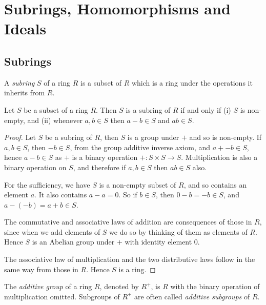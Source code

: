 \section{Subrings, Homomorphisms and Ideals}

\subsection{Subrings}

\begin{Def}
  A \emph{subring} $S$ of a ring $R$ is a subset of $R$ which is a ring under
  the operations it inherits from $R$.
\end{Def}

\begin{Lemma}
  Let $S$ be a subset of a ring $R$. Then $S$ is a subring of $R$ if and only
  if (i) $S$ is non-empty, and (ii) whenever $a, b \in S$ then $a - b \in S$
  and $ab \in S$.
\end{Lemma}

\begin{proof}
  Let $S$ be a subring of $R$, then $S$ is a group under $+$ and so is
  non-empty. If $a, b \in S$, then $-b \in S$, from the group additive inverse
  axiom, and $a + -b \in S$, hence $a - b \in S$ as $+$ is a binary operation
  $+: S \times S \to S$.  Multiplication is also a binary operation on $S$, and
  therefore if $a, b \in S$ then $ab \in S$ also.

  For the sufficiency, we have $S$ is a non-empty subset of $R$, and so
  contains an element $a$. It also contains $a - a = 0$.  So if $b \in S$, then
  $0 - b = -b \in S$, and $a - (-b) = a + b \in S$.

  The commutative and associative laws of addition are consequences of those in
  $R$, since when we add elements of $S$ we do so by thinking of them as
  elements of $R$. Hence $S$ is an Abelian group under $+$ with identity
  element $0$.

  The associative law of multiplication and the two distributive laws follow in
  the same way from those in $R$. Hence $S$ is a ring.
\end{proof}

\begin{Def}
  The \emph{additive group} of a ring $R$, denoted by $R^+$, is $R$ with the
  binary operation of multiplication omitted. Subgroups of $R^+$ are often
  called \emph{additive subgroups} of $R$.
\end{Def}

